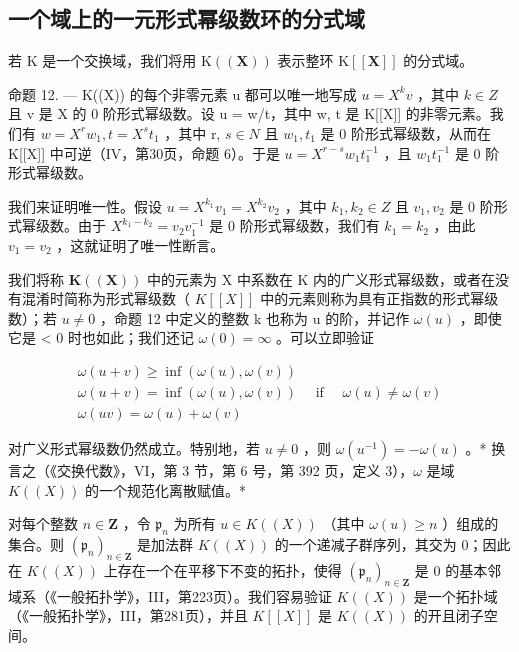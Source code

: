 \subsection{一个域上的一元形式幂级数环的分式域}

若 K 是一个交换域，我们将用 \(\mathrm{K}((\mathbf{X}))\) 表示整环 \(\mathrm{K}[[\mathbf{X}]]\) 的分式域。

命题 12. --- K((X)) 的每个非零元素 u 都可以唯一地写成 \(u = X^{k}v\) ，其中 \(k \in Z\) 且 v 是 X 的 0 阶形式幂级数。设 u = w/t，其中 w, t 是 K{[}{[}X{]}{]} 的非零元素。我们有 \(w = X^{r}w_{1}, t = X^{s}t_{1}\) ，其中 r, \(s \in N\) 且 \(w_{1}, t_{1}\) 是 0 阶形式幂级数，从而在 K{[}{[}X{]}{]} 中可逆（IV，第30页，命题 6）。于是 \(u = X^{r-s}w_{1}t_{1}^{-1}\) ，且 \(w_{1}t_{1}^{-1}\) 是 0 阶形式幂级数。

我们来证明唯一性。假设 \(u = X^{k_{1}}v_{1} = X^{k_{2}}v_{2}\) ，其中 \(k_{1}, k_{2} \in Z\) 且 \(v_{1}, v_{2}\) 是 0 阶形式幂级数。由于 \(X^{k_{1}-k_{2}} = v_{2}v_{1}^{-1}\) 是 0 阶形式幂级数，我们有 \(k_{1} = k_{2}\) ，由此 \(v_{1} = v_{2}\) ，这就证明了唯一性断言。

我们将称 \(\mathbf{K}((\mathbf{X}))\) 中的元素为 X 中系数在 K 内的广义形式幂级数，或者在没有混淆时简称为形式幂级数（ \(K[[X]]\) 中的元素则称为具有正指数的形式幂级数）；若 \(u \neq 0\) ，命题 12 中定义的整数 k 也称为 u 的阶，并记作 \(\omega(u)\) ，即使它是 \textless{} 0 时也如此；我们还记 \(\omega(0) = \infty\) 。可以立即验证

\[
\begin{array}{l} \omega (u + v) \geqslant \inf (\omega (u), \omega (v)) \\ \omega (u + v) = \inf (\omega (u), \omega (v)) \quad \text { if } \quad \omega (u) \neq \omega (v) \\ \omega (u v) = \omega (u) + \omega (v) \end{array}
\]

对广义形式幂级数仍然成立。特别地，若 \(u \neq 0\) ，则 \(\omega(u^{-1}) = -\omega(u)\) 。* 换言之（《交换代数》，VI，第 3 节，第 6 号，第 392 页，定义 3），\(\omega\) 是域 \(K((X))\) 的一个规范化离散赋值。*

对每个整数 \(n \in \mathbf{Z}\) ，令 \(\mathfrak{p}_n\) 为所有 \(u \in K((X))\) （其中 \(\omega(u) \geqslant n\) ）组成的集合。则 \((\mathfrak{p}_n)_{n \in \mathbf{Z}}\) 是加法群 \(K((X))\) 的一个递减子群序列，其交为 0；因此在 \(K((X))\) 上存在一个在平移下不变的拓扑，使得 \((\mathfrak{p}_n)_{n \in \mathbf{Z}}\) 是 0 的基本邻域系（《一般拓扑学》，III，第223页）。我们容易验证 \(K((X))\) 是一个拓扑域（《一般拓扑学》，III，第281页），并且 \(K[[X]]\) 是 \(K((X))\) 的开且闭子空间。

